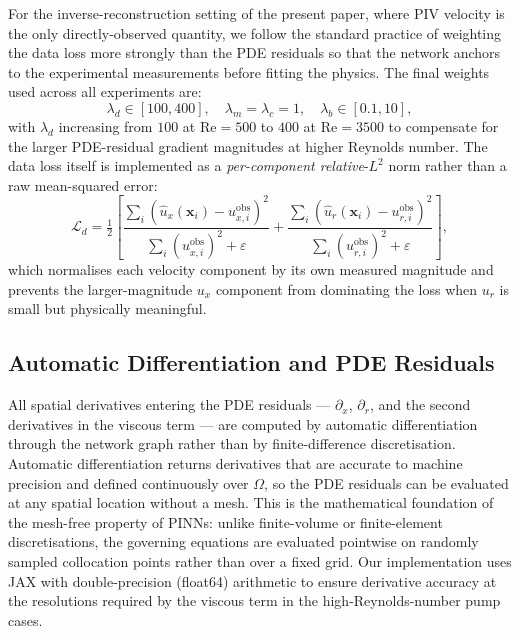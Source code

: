 \documentclass[12pt,a4paper]{article}
\newcommand{\bx}{\bm{x}}          %
\newcommand{\Reyn}{\mathrm{Re}}    %
\newcommand{\Loss}{\mathcal{L}}    %
\begin{document}
For the inverse-reconstruction setting of the present paper,
where PIV velocity is the only directly-observed quantity, we
follow the standard practice of weighting the data loss more
strongly than the PDE residuals so that the network anchors to
the experimental measurements before fitting the physics. The
final weights used across all experiments are:
\begin{equation*}
  \lambda_d \in [100, 400],
  \quad
  \lambda_m = \lambda_c = 1,
  \quad
  \lambda_b \in [0.1, 10],
\end{equation*}
with $\lambda_d$ increasing from $100$ at $\Reyn = 500$ to $400$
at $\Reyn = 3500$ to compensate for the larger PDE-residual
gradient magnitudes at higher Reynolds number. The data loss
itself is implemented as a \emph{per-component relative}-$L^2$
norm rather than a raw mean-squared error:
\begin{equation}
  \Loss_d
  = \tfrac{1}{2}\!\left[
    \frac{\sum_i (\hat{u}_x(\bx_i) - u_{x,i}^{\text{obs}})^2}
         {\sum_i (u_{x,i}^{\text{obs}})^2 + \varepsilon}
   +\frac{\sum_i (\hat{u}_r(\bx_i) - u_{r,i}^{\text{obs}})^2}
         {\sum_i (u_{r,i}^{\text{obs}})^2 + \varepsilon}
   \right],
  \label{eq:loss_data_rel}
\end{equation}
which normalises each velocity component by its own measured
magnitude and prevents the larger-magnitude $u_x$ component
from dominating the loss when $u_r$ is small but
physically meaningful.

\subsection{Automatic Differentiation and PDE Residuals}
\label{sec:autodiff}

All spatial derivatives entering the PDE residuals ---
$\partial_x$, $\partial_r$, and the second derivatives in the
viscous term --- are computed by automatic differentiation
\cite{Baydin2018AutoDiff} through the network graph rather than
by finite-difference discretisation. Automatic differentiation
returns derivatives that are accurate to machine precision and
defined continuously over $\Omega$, so the PDE residuals can be
evaluated at any spatial location without a mesh. This is the
mathematical foundation of the mesh-free property of PINNs:
unlike finite-volume or finite-element discretisations, the
governing equations are evaluated pointwise on randomly
sampled collocation points rather than over a fixed grid. Our
implementation uses JAX
\cite{Frostig2018JAX} with double-precision (float64) arithmetic
to ensure derivative accuracy at the resolutions required by
the viscous term in the high-Reynolds-number pump cases.
\end{document}

